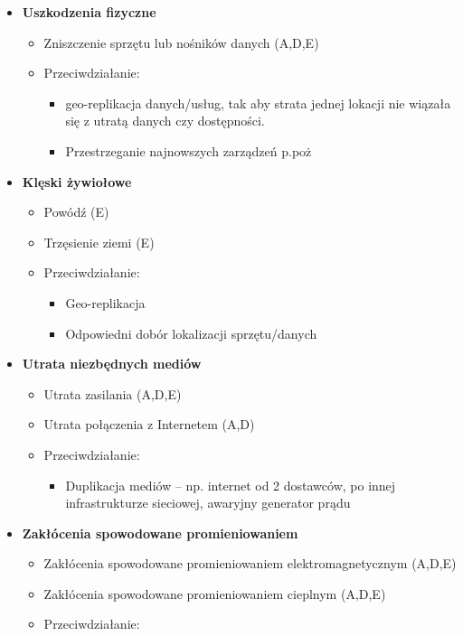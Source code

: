 \begin{itemize}
	\item \textbf{Uszkodzenia fizyczne}
	\begin{itemize}
		\item Zniszczenie sprzętu lub nośników danych (A,D,E)
		\item Przeciwdziałanie:
		\begin{itemize}
			\item geo-replikacja danych/usług, tak aby strata jednej lokacji nie wiązała się z utratą danych czy dostępności.
			\item Przestrzeganie najnowszych zarządzeń p.poż
		\end{itemize}
	\end{itemize}
	\item \textbf{Klęski żywiołowe}
	\begin{itemize}
		\item Powódź (E)
		\item Trzęsienie ziemi (E)
		\item Przeciwdziałanie:
		\begin{itemize}
			\item Geo-replikacja
			\item Odpowiedni dobór lokalizacji sprzętu/danych
		\end{itemize}
	\end{itemize}
	\item \textbf{Utrata niezbędnych mediów}
	\begin{itemize}
		\item Utrata zasilania (A,D,E)
		\item Utrata połączenia z Internetem (A,D)
		\item Przeciwdziałanie:
		\begin{itemize}
			\item Duplikacja mediów – np. internet od 2 dostawców, po innej infrastrukturze sieciowej, awaryjny generator prądu
		\end{itemize}
	\end{itemize}
	\item \textbf{Zakłócenia spowodowane promieniowaniem}
	\begin{itemize}
		\item Zakłócenia spowodowane promieniowaniem elektromagnetycznym (A,D,E)
		\item Zakłócenia spowodowane promieniowaniem cieplnym (A,D,E)
		\item Przeciwdziałanie:
		\begin{itemize}

\end{itemize}
\end{itemize}
\end{itemize}
